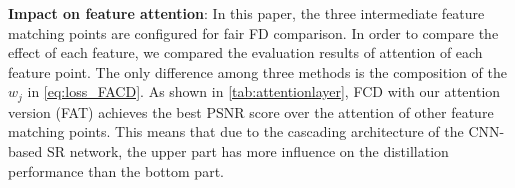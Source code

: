 \documentclass[10pt,twocolumn,letterpaper]{article}
\begin{document}
\noindent \textbf{Impact on feature attention}: In this paper, the three intermediate feature matching points are configured for fair FD comparison. In order to compare the effect of each feature, we compared the evaluation results of attention of each feature point. The only difference among three methods is the composition of the \begin{math}w_j\end{math} in \cref{eq:loss_FACD}. As shown in \cref{tab:attentionlayer}, FCD with our attention version (FAT) achieves the best PSNR score over the attention of other feature matching points. This means that due to the cascading architecture of the CNN-based SR network, the upper part has more influence on the distillation performance than the bottom part.

\begin{table}[h]
\centering
\caption{Ablation study (PSNR) of the feature attention on EDSR x2. FAA, FAB, and FAT indicate paying attention to the average, bottom, and top parts of features matching points, respectively. FAU is the version of this paper. The better performance is marked in \textbf{bold}.}


\label{tab:attentionlayer}
\end{table}
\end{document}
